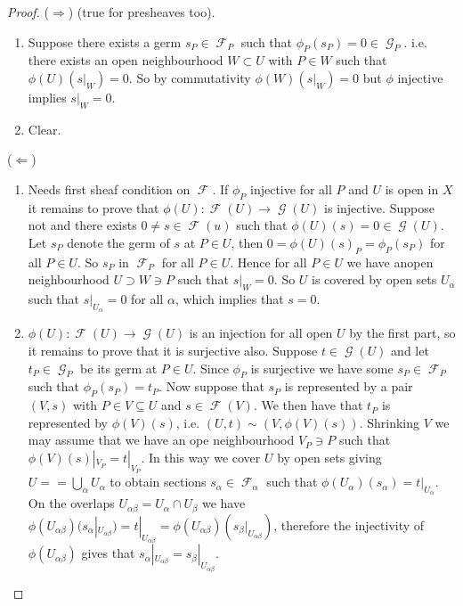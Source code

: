 \documentclass[10pt,]{book}
\theoremstyle{plain}
\theoremstyle{definition}
\DeclareMathOperator{\F}{\mathcal{F}}
\DeclareMathOperator{\G}{\mathcal{G}}
\begin{document}
\begin{proof}
(\(\Rightarrow\)) (true for presheaves too).
              \begin{enumerate}
\item{}Suppose there exists a germ \(s_P\in\F_P\) such that \(\phi_P(s_P) = 0\in \G_P\).
                  i.e. there exists an open neighbourhood \(W \subset U\) with \(P\in W\) such that \(\phi(U)(s|_W) = 0\).
                  So by commutativity \(\phi(W)(s|_W) = 0\) but \(\phi\) injective implies \(s|_W = 0\).
                \item{}Clear.\end{enumerate}

              (\(\Leftarrow\))
              \begin{enumerate}
\item{}Needs first sheaf condition on \(\F\).
                  If \(\phi_P\) injective for all \(P\) and \(U\) is open in \(X\) it remains to prove that \(\phi(U) \colon \F(U) \to \G(U)\) is injective.
                  Suppose not and there exists \(0 \ne s \in \F(u)\) such that \(\phi(U)(s) = 0 \in \G(U)\).
                  Let \(s_P\) denote the germ of \(s\) at \(P \in U\), then \(0 = \phi(U)(s)_P = \phi_P(s_P)\) for all \(P\in U\).
                  So \(s_P\) in \(\F_P\) for all \(P \in U\).
                  Hence for all \(P\in U\) we have anopen neighbourhood \(U \supset W \ni P\) such that \(s|_W = 0\).
                  So \(U\) is covered by open sets \(U_\alpha\) such that \(s|_{U_\alpha} = 0\) for all \(\alpha\), which implies that \(s = 0\).
                \item{}\(\phi(U) \colon \F(U) \to \G(U)\) is an injection for all open \(U\) by the first part, so it remains to prove that it is surjective also.
                  Suppose \(t \in \G(U)\) and let \(t_P\in\G_P\) be its germ at \(P\in U\).
                  Since \(\phi_P\) is surjective we have some \(s_P\in \F_P\) such that \(\phi_P(s_P) = t_P\).
                  Now suppose that \(s_P\) is represented by a pair \((V,s)\) with \(P\in V \subseteq U\) and \(s\in \F(V)\).
                  We then have that \(t_P\) is represented by \(\phi(V)(s)\), i.e. \((U,t)\sim (V,\phi(V)(s))\).
                  Shrinking \(V\) we may assume that we have an ope neighbourhood \(V_P\ni P\) such that \(\phi(V)(s)|_{V_P} = t|_{V_P}\).
                  In this way we cover \(U\) by open sets giving \(U = = \bigcup_{\alpha} U_\alpha\) to obtain sections \(s_\alpha \in\F_\alpha\) such that \(\phi(U_\alpha)(s_\alpha) = t|_{U_\alpha}\).
                  On the overlaps \(U_{\alpha\beta} = U_\alpha \cap U_\beta\) we have \(\phi(U_{\alpha\beta})(s_\alpha|_{U_{\alpha\beta}}) = t|_{U_{\alpha\beta}} = \phi(U_{\alpha\beta})(s_\beta|_{U_{\alpha\beta}})\), therefore the injectivity of \(\phi(U_{\alpha\beta})\) gives that \(s_\alpha|_{U_{\alpha\beta}} = s_\beta|_{U_{\alpha\beta}}\).

\end{enumerate}
\end{proof}
\end{document}
